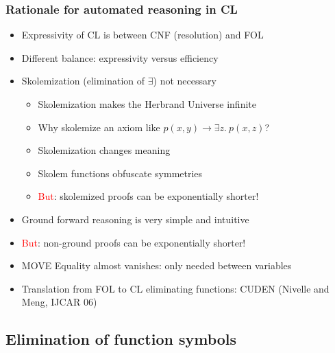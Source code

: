 \documentclass[handout,11pt]{beamer}
\newcommand{\red}[1]{\textcolor{red}{#1}}
\begin{document}
\begin{frame}
\frametitle{Rationale for automated reasoning in CL}
 \begin{itemize}[<+->] %
    \item Expressivity of CL is between CNF (resolution) and FOL
    \item Different balance: expressivity versus efficiency
    \item Skolemization (elimination of $\exists$) not necessary
    \begin{itemize}
       \item Skolemization makes the Herbrand Universe infinite
       \item Why skolemize an axiom like $p(x,y)\to\exists z.~p(x,z)$?
       \item Skolemization changes meaning
       \item Skolem functions obfuscate symmetries
       \item \red{But}: skolemized proofs can be exponentially shorter!
    \end{itemize}
   \item Ground forward reasoning is very simple and intuitive
   \item \red{But}: non-ground proofs can be exponentially shorter!   
   \item MOVE Equality almost vanishes: only needed between variables
   \item Translation from FOL to CL eliminating functions: CUDEN (Nivelle and Meng, IJCAR 06)
 \end{itemize}
\end{frame}



 
\subsection{Elimination of function symbols}
\end{document}
